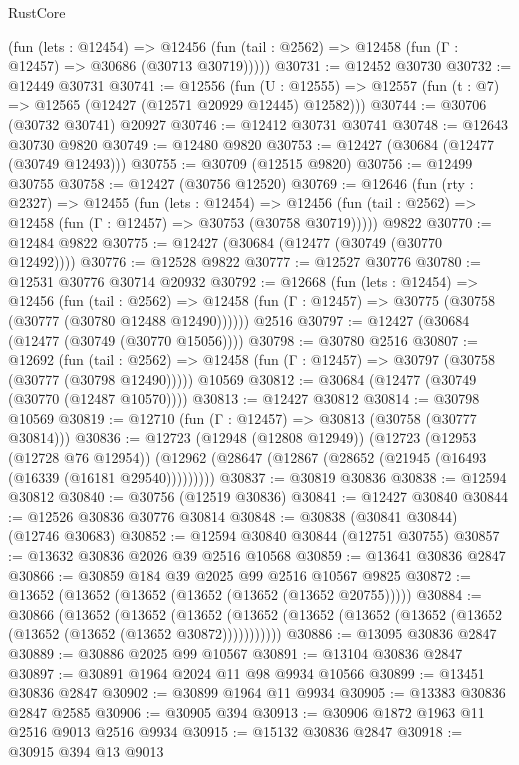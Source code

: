 \begin{lexlean}{RustCore}
\begin{coremodule}
      (fun (lets : @12454) =>
      @12456 (fun (tail : @2562) => @12458 (fun (Γ : @12457) => @30686 (@30713 @30719)))))
@30731 := @12452 @30730
@30732 := @12449 @30731
@30741 := @12556
    (fun (U : @12555) => @12557 (fun (t : @7) => @12565 (@12427 (@12571 @20929 @12445) @12582)))
@30744 := @30706 (@30732 @30741) @20927
@30746 := @12412 @30731 @30741
@30748 := @12643 @30730 @9820
@30749 := @12480 @9820
@30753 := @12427 (@30684 (@12477 (@30749 @12493)))
@30755 := @30709 (@12515 @9820)
@30756 := @12499 @30755
@30758 := @12427 (@30756 @12520)
@30769 := @12646
    (fun (rty : @2327) =>
    @12455
      (fun (lets : @12454) =>
      @12456 (fun (tail : @2562) => @12458 (fun (Γ : @12457) => @30753 (@30758 @30719)))))
    @9822
@30770 := @12484 @9822
@30775 := @12427 (@30684 (@12477 (@30749 (@30770 @12492))))
@30776 := @12528 @9822
@30777 := @12527 @30776
@30780 := @12531 @30776 @30714 @20932
@30792 := @12668
    (fun (lets : @12454) =>
    @12456
      (fun (tail : @2562) =>
      @12458 (fun (Γ : @12457) => @30775 (@30758 (@30777 (@30780 @12488 @12490))))))
    @2516
@30797 := @12427 (@30684 (@12477 (@30749 (@30770 @15056))))
@30798 := @30780 @2516
@30807 := @12692
    (fun (tail : @2562) => @12458 (fun (Γ : @12457) => @30797 (@30758 (@30777 (@30798 @12490)))))
    @10569
@30812 := @30684 (@12477 (@30749 (@30770 (@12487 @10570))))
@30813 := @12427 @30812
@30814 := @30798 @10569
@30819 := @12710 (fun (Γ : @12457) => @30813 (@30758 (@30777 @30814)))
@30836 := @12723
    (@12948 (@12808 @12949))
    (@12723
      (@12953 (@12728 @76 @12954))
      (@12962 (@28647 (@12867 (@28652 (@21945 (@16493 (@16339 (@16181 @29540)))))))))
@30837 := @30819 @30836
@30838 := @12594 @30812
@30840 := @30756 (@12519 @30836)
@30841 := @12427 @30840
@30844 := @12526 @30836 @30776 @30814
@30848 := @30838 (@30841 @30844) (@12746 @30683)
@30852 := @12594 @30840 @30844 (@12751 @30755)
@30857 := @13632 @30836 @2026 @39 @2516 @10568
@30859 := @13641 @30836 @2847
@30866 := @30859 @184 @39 @2025 @99 @2516 @10567 @9825
@30872 := @13652 (@13652 (@13652 (@13652 (@13652 (@13652 @20755)))))
@30884 := @30866
    (@13652
      (@13652
        (@13652 (@13652 (@13652 (@13652 (@13652 (@13652 (@13652 (@13652 (@13652 @30872)))))))))))
@30886 := @13095 @30836 @2847
@30889 := @30886 @2025 @99 @10567
@30891 := @13104 @30836 @2847
@30897 := @30891 @1964 @2024 @11 @98 @9934 @10566
@30899 := @13451 @30836 @2847
@30902 := @30899 @1964 @11 @9934
@30905 := @13383 @30836 @2847 @2585
@30906 := @30905 @394
@30913 := @30906 @1872 @1963 @11 @2516 @9013 @2516 @9934
@30915 := @15132 @30836 @2847
@30918 := @30915 @394 @13 @9013

\end{coremodule}
\end{lexlean}
